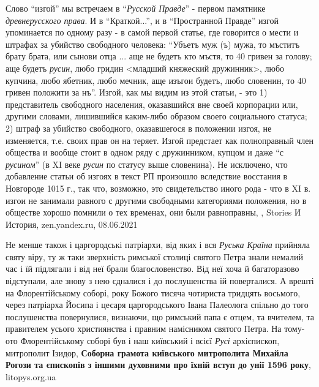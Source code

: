 Слово \enquote{изгой} мы встречаем в \enquote{\emph{Русской Правде}} - первом
памятнике \emph{древнерусского права}. И в \enquote{Краткой...}, и в
\enquote{Пространной Правде} изгой упоминается по одному разу - в самой первой
статье, где говорится о мести и штрафах за убийство свободного человека:
\enquote{Убъетъ муж (ъ) мужа, то мъститъ брату брата, или сынови отца ... аще
не будетъ кто мъстя, то 40 гривен за голову; аще будетъ \emph{русин}, любо гридин
<младший княжеский дружинник>, любо купчина, любо ябетник, любо мечник, аще
изъгои будетъ, любо словенин, то 40 гривен положити за нъ}. Изгой, как мы видим
из этой статьи, - это 1) представитель свободного населения, оказавшийся вне
своей корпорации или, другими словами, лишившийся каким-либо образом своего
социального статуса; 2) штраф за убийство свободного, оказавшегося в положении
изгоя, не изменяется, т.е. своих прав он на теряет.  Изгой предстает как
полноправный член общества и вообще стоит в одном ряду с дружинником, купцом и
даже \enquote{с \emph{русином}} (в XI веке \emph{русин} по статусу выше словенина).  Не
исключено, что добавление статьи об изгоях в текст РП произошло вследствие
восстания в Новгороде 1015 г., так что, возможно, это свидетельство иного рода
- что в XI в. изгои не занимали равного с другими свободными категориями
положения, но в обществе хорошо помнили о тех временах, они были равноправны,
, Stories И История, zen.yandex.ru, 08.06.2021

Не менше також і царгородські патріархи, від яких і вся \emph{Руська Країна}
прийняла святу віру, ту ж таки зверхність римської столиці святого Петра знали
немалий час і їй підлягали і від неї брали благословенство. Від неї хоча й
багаторазово відступали, але знову з нею єдналися і до послушенства їй
поверталися. А врешті на Флорентійському соборі, року Божого тисяча чотириста
тридцять восьмого, через патріарха Йосипа і цесаря царгородського Івана
Палеолога спільно до того послушенства повернулися, визнаючи, що римський папа
є отцем, та вчителем, та правителем усього християнства і правним намісником
святого Петра. На тому-ото Флорентійському соборі був і наш київський і всієї
\emph{Русі} архієпископ, митрополит Ізидор,
\textbf{Соборна грамота київського митрополита Михайла Рогози та єпископів з
іншими духовними про їхній вступ до унії 1596 року}, litopys.org.ua

